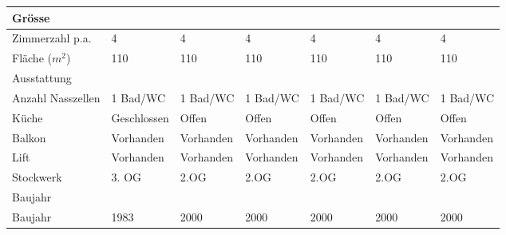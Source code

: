 \documentclass{article}
\begin{document}
\begin{table}[!htbp]
\begin{flushleft}
\begin{tabular}{ |l|l|l|l|l|l|l| }
				\rowcolor{gray} Grösse & & & & & &  \\ 
				\hline
				Zimmerzahl p.a. & \cellcolor{lightgray} 4 & 4 & 4 & 4 & 4 & 4 \\ 
				\hline
				Fläche ($m^2$) & \cellcolor{lightgray} 110 & 110 & 110 & 110 & 110 & 110 \\ 
				\hline
				\rowcolor{gray} Ausstattung & & & & & &  \\ 
				\hline
				Anzahl Nasszellen & \cellcolor{lightgray} 1 Bad/WC & 1 Bad/WC & 1 Bad/WC & 1 Bad/WC & 1 Bad/WC & 1 Bad/WC \\ 
				\hline
				Küche & \cellcolor{lightgray} Geschlossen & Offen & Offen & Offen & Offen & Offen \\ 
				\hline
				Balkon & \cellcolor{lightgray} Vorhanden & Vorhanden & Vorhanden & Vorhanden & Vorhanden & Vorhanden \\ 
				\hline
				Lift & \cellcolor{lightgray} Vorhanden & Vorhanden & Vorhanden & Vorhanden & Vorhanden & Vorhanden \\ 
				\hline
				Stockwerk & \cellcolor{lightgray} 3. OG & 2.OG & 2.OG & 2.OG & 2.OG & 2.OG \\ 
				\hline
				\rowcolor{gray} Baujahr & & & & & &  \\
				\hline
				Baujahr & \cellcolor{lightgray} 1983 & 2000 & 2000 & 2000 & 2000 & 2000\\ 
				\hline
			\end{tabular}
	\end{flushleft}
	\end{table}

	\clearpage
	
\end{document}
